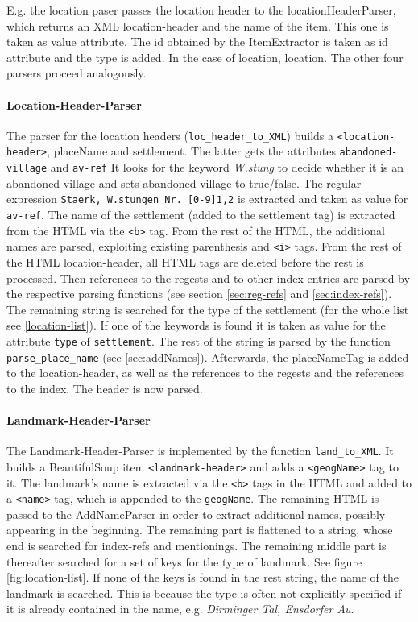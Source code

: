 E.g. the location paser passes the location header to the locationHeaderParser, which returns an XML location-header and the name of the item. This one is taken as value attribute. The id obtained by the ItemExtractor is taken as id attribute and the type is added. In the case of location, location. The other four parsers proceed analogously.

\paragraph{Location-Header-Parser}
The parser for the location headers (\texttt{loc\_header\_to\_XML}) builds a \texttt{<location-header>}, placeName and settlement. The latter gets the attributes \texttt{abandoned-village} and \texttt{av-ref} It looks for the keyword \textit{W.stung} to decide whether it is an abandoned village and sets abandoned village to true/false. The regular expression \texttt{Staerk, W.stungen Nr. [0-9]{1,2}} is extracted and taken as value for \texttt{av-ref}. The name of the settlement (added to the settlement tag) is extracted from the HTML via the \texttt{<b>} tag. From the rest of the HTML, the additional names are parsed, exploiting existing parenthesis and \texttt{<i>} tags. From the rest of the HTML location-header, all HTML tags are deleted before the rest is processed. Then references to the regests and to other index entries are parsed by the respective parsing functions (see section \ref{sec:reg-refs} and \ref{sec:index-refs}). The remaining string is searched for the type of the settlement (for the whole list see \ref{location-list}). If one of the keywords is found it is taken as value for the attribute \texttt{type} of \texttt{settlement}. The rest of the string is parsed by the function \texttt{parse\_place\_name} (see \ref{sec:addNames}). Afterwards, the placeNameTag is added to the location-header, as well as the references to the regests and the references to the index. The header is now parsed.

\paragraph{Landmark-Header-Parser}
The Landmark-Header-Parser is implemented by the function \texttt{land\_to\_XML}. It builds a BeautifulSoup item \texttt{<landmark-header>} and adds a \texttt{<geogName>} tag to it. The landmark's name is extracted via the \texttt{<b>} tags in the HTML and added to a \texttt{<name>} tag, which is appended to the \texttt{geogName}. The remaining HTML is passed to the AddNameParser in order to extract additional names, possibly appearing in the beginning. The remaining part is flattened to a string, whose end is searched for index-refs and mentionings. The remaining middle part is thereafter searched for a set of keys for the type of landmark. See figure \ref{fig:location-list}. If none of the keys is found in the rest string, the name of the landmark is searched. This is because the type is often not explicitly specified if it is already contained in the name, e.g. \textit{Dirminger Tal, Ensdorfer Au}.

